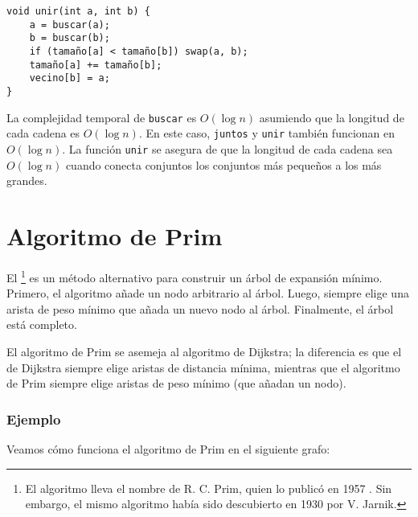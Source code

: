 \begin{lstlisting}
void unir(int a, int b) {
    a = buscar(a);
    b = buscar(b);
    if (tamaño[a] < tamaño[b]) swap(a, b);
    tamaño[a] += tamaño[b];
    vecino[b] = a;
}
\end{lstlisting}

La complejidad temporal de \texttt{buscar} es $O(\log n)$
asumiendo que la longitud de cada cadena es $O(\log n)$. En este caso,
\texttt{juntos} y \texttt{unir} también funcionan
en $O(\log n)$. La función \texttt{unir} se asegura de que la longitud
de cada cadena sea $O(\log n)$ cuando conecta conjuntos los conjuntos
más pequeños a los más grandes.

\section{Algoritmo de Prim}


El \footnote{El algoritmo lleva el nombre
    de R. C. Prim, quien lo publicó en 1957 \cite{pri57}. Sin
    embargo, el mismo algoritmo había sido descubierto en 1930
    por V. Jarnik.} es un método alternativo para construir
un árbol de expansión mínimo. Primero, el algoritmo añade un
nodo arbitrario al árbol. Luego, siempre elige una arista de
peso mínimo que añada un nuevo nodo al árbol. Finalmente, el árbol
está completo.

El algoritmo de Prim se asemeja al algoritmo de Dijkstra; la
diferencia es que el de Dijkstra siempre elige aristas
de distancia mínima, mientras que el algoritmo de Prim siempre
elige aristas de peso mínimo (que añadan un nodo).

\subsubsection{Ejemplo}

Veamos cómo funciona el algoritmo de Prim en el siguiente grafo:
\begin{center}
\end{center}

